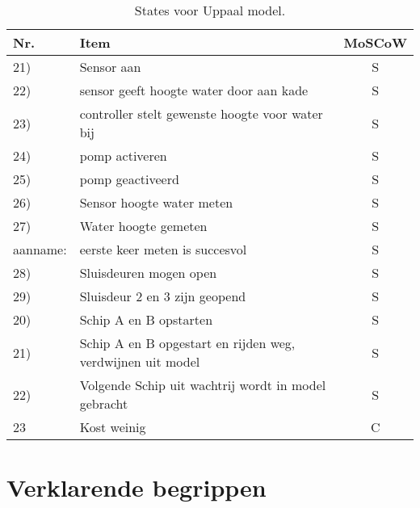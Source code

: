 \documentclass[a4paper,12pt]{article}
\begin{document}
\begin{table}[h] %
\caption{States voor Uppaal model.} %
\label{reqs} %
\begin{center} %
\begin{tabular}{llc} %
\hline %
\textbf{Nr.} & \textbf{Item} & \textbf{MoSCoW}\\ %
\hline
21) & Sensor aan & S\\
22) & sensor geeft hoogte water door aan kade & S\\
23) & controller stelt gewenste hoogte voor water bij & S\\
24) & pomp activeren & S\\
25) & pomp geactiveerd & S\\
26) & Sensor hoogte water meten & S\\
27) & Water hoogte gemeten & S\\
aanname: & eerste keer meten is succesvol & S\\
28) &  Sluisdeuren mogen open & S\\
29) &  Sluisdeur 2 en 3 zijn geopend & S\\
20) &  Schip A en B opstarten & S\\
21) & Schip A en B opgestart en rijden weg, verdwijnen uit model & S\\
22) & Volgende Schip uit wachtrij wordt in model gebracht & S\\
23  & Kost weinig & C\\

\hline
\end{tabular}
\end{center}
\end{table}

\section{Verklarende begrippen}
\end{document}
